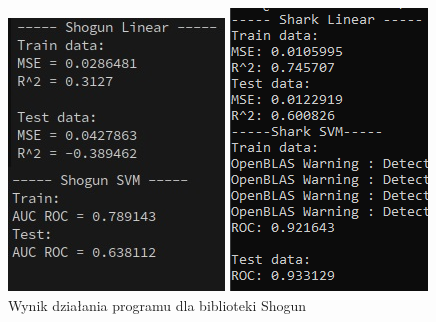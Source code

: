 \begin{figure}[!ht]
	\centering
	\begin{minipage}{0.31\textwidth}
		\centering
		\includegraphics[width=0.8\linewidth]{Rozdzial7/shogun_linear_svm}
		\caption{Wynik działania programu dla biblioteki Shogun}
		\label{fig:shogun_linear_svm2}		
	\end{minipage}%
	\hspace{0.02\textwidth}
	\begin{minipage}{0.31\textwidth}
		\centering
		\includegraphics[width=0.7\linewidth]{Rozdzial7/shark_linear_svm}

\end{minipage}
\end{figure}
